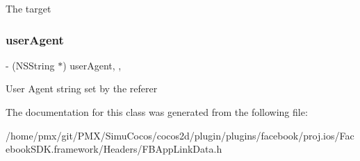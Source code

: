 The target \mbox{\label{interfaceFBAppLinkData_a79148a205bca6e32895d00f68417d3d6}} 
\subsubsection{\texorpdfstring{user\+Agent}{userAgent}}
{\footnotesize\ttfamily -\/ (N\+S\+String $\ast$) user\+Agent\hspace{0.3cm}{\ttfamily [read]}, {\ttfamily [atomic]}, {\ttfamily [assign]}}

User Agent string set by the referer 

The documentation for this class was generated from the following file\+:\begin{DoxyCompactItemize}
\item 
/home/pmx/git/\+P\+M\+X/\+Simu\+Cocos/cocos2d/plugin/plugins/facebook/proj.\+ios/\+Facebook\+S\+D\+K.\+framework/\+Headers/F\+B\+App\+Link\+Data.\+h\end{DoxyCompactItemize}
